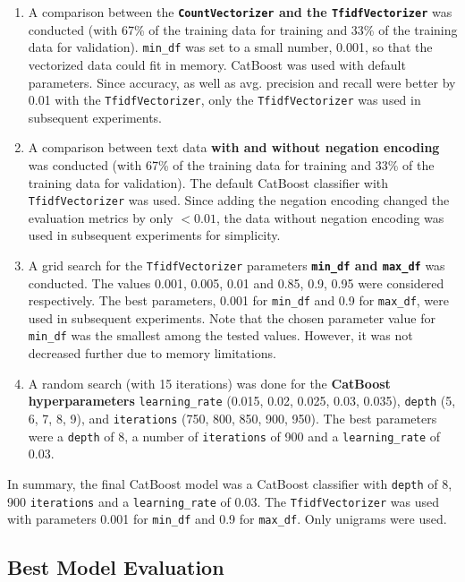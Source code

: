 \documentclass{article}
\begin{document}
	
	\begin{enumerate}
		\item 	A comparison between the \textbf{\lstinline{CountVectorizer} and the \lstinline{TfidfVectorizer}} was conducted (with 67\% of the training data for training and 33\% of the training data for validation). \lstinline{min_df} was set to a small number, 0.001, so that the vectorized data could fit in memory. CatBoost was used with default parameters. Since accuracy, as well as avg. precision and recall were better by 0.01 with the \lstinline{TfidfVectorizer}, only the \lstinline{TfidfVectorizer} was used in subsequent experiments.
		\item 	A comparison between text data \textbf{with and without negation encoding} was conducted (with 67\% of the training data for training and 33\% of the training data for validation). The default CatBoost classifier with \lstinline{TfidfVectorizer} was used. Since adding the negation encoding changed the evaluation metrics by only $<0.01$, the data without negation encoding was used in subsequent experiments for simplicity.
		\item 	A grid search for the \lstinline{TfidfVectorizer} parameters \textbf{\lstinline{min_df} and \lstinline{max_df}} was conducted. The values 0.001, 0.005, 0.01 and 0.85, 0.9, 0.95 were considered	respectively. The best parameters, 0.001 for \lstinline{min_df} and 0.9 for \lstinline{max_df}, were used in subsequent experiments. Note that the chosen parameter value for \lstinline{min_df} was the smallest among the tested values. However, it was not decreased further due to memory limitations.
		\item 	A random search (with 15 iterations) was done for the \textbf{CatBoost hyperparameters} \lstinline{learning_rate} (0.015, 0.02, 0.025, 0.03, 0.035), \lstinline{depth} (5, 6, 7, 8, 9), and \lstinline{iterations} (750, 800, 850, 900, 950). The best parameters were a \lstinline{depth} of 8, a number of \lstinline{iterations} of 900 and a \lstinline{learning_rate} of 0.03.
	\end{enumerate}
	
	In summary, the final CatBoost model was a CatBoost classifier with \lstinline{depth} of 8, 900 \lstinline{iterations} and a \lstinline{learning_rate} of 0.03. The \lstinline{TfidfVectorizer} was used with parameters 0.001 for \lstinline{min_df} and 0.9 for \lstinline{max_df}. Only unigrams were used.
	

	\subsection{Best Model Evaluation}
	
\end{document}
